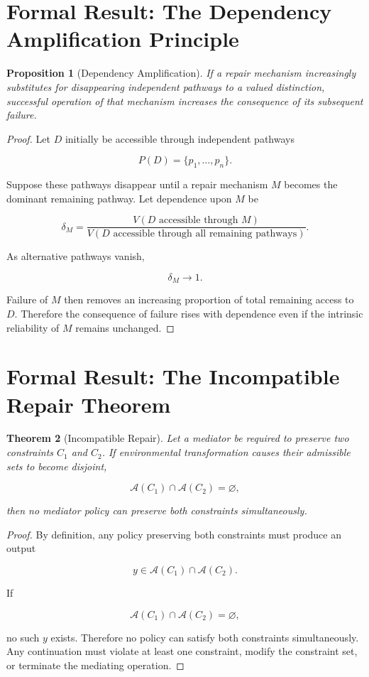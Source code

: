 \documentclass[11pt,oneside]{book}
\newtheorem{theorem}{Theorem}[chapter]
\newtheorem{proposition}[theorem]{Proposition}
\theoremstyle{definition}
\theoremstyle{remark}
\newcommand{\A}{\mathcal{A}}
\begin{document}
\section{Formal Result: The Dependency Amplification Principle}

\begin{proposition}[Dependency Amplification]
If a repair mechanism increasingly substitutes for disappearing independent pathways to a valued distinction, successful operation of that mechanism increases the consequence of its subsequent failure.
\end{proposition}

\begin{proof}
Let \(D\) initially be accessible through independent pathways

\[
P(D)=\{p_1,\ldots,p_n\}.
\]

Suppose these pathways disappear until a repair mechanism \(M\) becomes the dominant remaining pathway. Let dependence upon \(M\) be

\[
\delta_M
=
\frac{
V(D\text{ accessible through }M)
}{
V(D\text{ accessible through all remaining pathways})
}.
\]

As alternative pathways vanish,

\[
\delta_M\rightarrow1.
\]

Failure of \(M\) then removes an increasing proportion of total remaining access to \(D\). Therefore the consequence of failure rises with dependence even if the intrinsic reliability of \(M\) remains unchanged.
\end{proof}

\section{Formal Result: The Incompatible Repair Theorem}

\begin{theorem}[Incompatible Repair]
Let a mediator be required to preserve two constraints \(C_1\) and \(C_2\). If environmental transformation causes their admissible sets to become disjoint,

\[
\A(C_1)\cap\A(C_2)=\varnothing,
\]

then no mediator policy can preserve both constraints simultaneously.
\end{theorem}

\begin{proof}
By definition, any policy preserving both constraints must produce an output

\[
y\in
\A(C_1)\cap\A(C_2).
\]

If

\[
\A(C_1)\cap\A(C_2)=\varnothing,
\]

no such \(y\) exists. Therefore no policy can satisfy both constraints simultaneously. Any continuation must violate at least one constraint, modify the constraint set, or terminate the mediating operation.
\end{proof}
\end{document}
